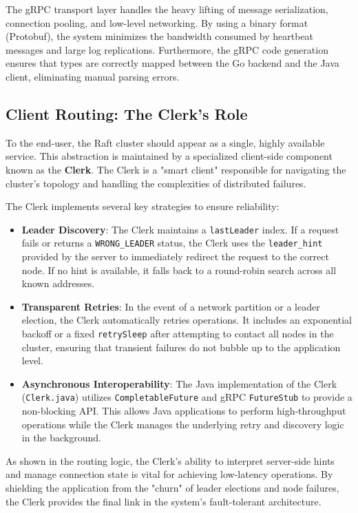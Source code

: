 The gRPC transport layer handles the heavy lifting of message serialization, connection pooling, and low-level networking. By using a binary format (Protobuf), the system minimizes the bandwidth consumed by heartbeat messages and large log replications. Furthermore, the gRPC code generation ensures that types are correctly mapped between the Go backend and the Java client, eliminating manual parsing errors.

\subsection{Client Routing: The Clerk's Role}
To the end-user, the Raft cluster should appear as a single, highly available service. This abstraction is maintained by a specialized client-side component known as the \textbf{Clerk}. The Clerk is a "smart client" responsible for navigating the cluster's topology and handling the complexities of distributed failures.

The Clerk implements several key strategies to ensure reliability:
\begin{itemize}
    \item \textbf{Leader Discovery}: The Clerk maintains a \texttt{lastLeader} index. If a request fails or returns a \texttt{WRONG\_LEADER} status, the Clerk uses the \texttt{leader\_hint} provided by the server to immediately redirect the request to the correct node. If no hint is available, it falls back to a round-robin search across all known addresses.
    \item \textbf{Transparent Retries}: In the event of a network partition or a leader election, the Clerk automatically retries operations. It includes an exponential backoff or a fixed \texttt{retrySleep} after attempting to contact all nodes in the cluster, ensuring that transient failures do not bubble up to the application level.
    \item \textbf{Asynchronous Interoperability}: The Java implementation of the Clerk (\texttt{Clerk.java}) utilizes \texttt{CompletableFuture} and gRPC \texttt{FutureStub} to provide a non-blocking API. This allows Java applications to perform high-throughput operations while the Clerk manages the underlying retry and discovery logic in the background.
\end{itemize}


As shown in the routing logic, the Clerk's ability to interpret server-side hints and manage connection state is vital for achieving low-latency operations. By shielding the application from the "churn" of leader elections and node failures, the Clerk provides the final link in the system's fault-tolerant architecture.